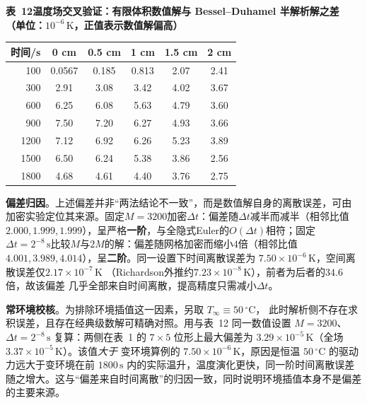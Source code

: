 \documentclass[withoutpreface,bwprint]{cumcmthesis} %
\begin{document}
\begin{appendices}
\begin{table}[htbp]
\centering
\begin{minipage}{\textwidth}
\centering
{\textbf{表~12\quad 温度场交叉验证：有限体积数值解与 Bessel--Duhamel 半解析解之差
（单位：$10^{-6}\,\mathrm{K}$，正值表示数值解偏高）}}\\[6pt]
\renewcommand{\arraystretch}{1.38}%
\begin{tabular*}{\textwidth}{@{\extracolsep{\fill}}rccccc@{}}
\toprule
时间/s & 0 cm & 0.5 cm & 1 cm & 1.5 cm & 2 cm \\
\midrule
100  & 0.0567 & 0.185 & 0.813 & 2.07 & 2.41 \\
300  & 2.91 & 3.08 & 3.42 & 4.02 & 3.67 \\
600  & 6.25 & 6.08 & 5.63 & 4.79 & 3.60 \\
900  & 7.50 & 7.20 & 6.27 & 4.93 & 3.66 \\
1200 & 7.12 & 6.92 & 6.26 & 5.23 & 3.89 \\
1500 & 6.50 & 6.24 & 5.38 & 3.86 & 2.56 \\
1800 & 4.68 & 4.61 & 4.40 & 3.76 & 2.75 \\
\bottomrule
\end{tabular*}
\end{minipage}
\end{table}

\textbf{偏差归因}。上述偏差并非``两法结论不一致''，而是数值解自身的离散误差，可由
加密实验定位其来源。固定$M=3200$加密$\Delta t$：偏差随$\Delta t$减半而减半（相邻比值
$2.000,1.999,1.999$），呈严格\textbf{一阶}，与全隐式Euler的$O(\Delta t)$相符；固定
$\Delta t=2^{-8}\,\mathrm{s}$比较$M$与$2M$的解：偏差随网格加密而缩小$4$倍（相邻比值
$4.001,3.989,4.014$），呈\textbf{二阶}。同一设置下时间离散误差为
$7.50\times10^{-6}\,\mathrm{K}$，空间离散误差仅$2.17\times10^{-7}\,\mathrm{K}$
（Richardson外推约$7.23\times10^{-8}\,\mathrm{K}$），前者为后者的$34.6$倍，故该偏差
几乎全部来自时间离散，提高精度只需减小$\Delta t$。

\textbf{常环境校核}。为排除环境插值这一因素，另取 $T_\infty\equiv50\,^\circ\mathrm{C}$，
此时解析侧不存在求积误差，且存在经典级数解可精确对照。用与表~12 同一数值设置
$M=3200$、$\Delta t=2^{-8}\,\mathrm{s}$ 复算：两侧在表~1 的 $7\times5$ 位形上最大偏差为
$3.29\times10^{-5}\,\mathrm{K}$（全场 $3.37\times10^{-5}\,\mathrm{K}$）。该值\emph{大于}
变环境算例的 $7.50\times10^{-6}\,\mathrm{K}$，原因是恒温 $50\,^\circ\mathrm{C}$ 的驱动
力远大于变环境在前 $1800\,\mathrm{s}$ 内的实际温升，温度演化更快，同一阶时间离散误差
随之增大。这与``偏差来自时间离散''的归因一致，同时说明环境插值本身不是偏差的主要来源。


\end{appendices}
\end{document}
